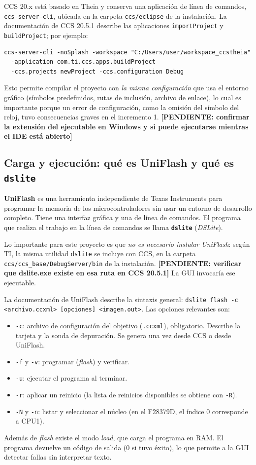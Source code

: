 \documentclass[12pt,letterpaper]{article}
\newcommand{\pendiente}[1]{\textbf{[PENDIENTE: #1]}}
\begin{document}
CCS 20.x está basado en Theia y conserva una aplicación de línea de comandos, \texttt{ccs-server-cli}, ubicada en la carpeta \texttt{ccs/eclipse} de la instalación. La documentación de CCS 20.5.1 describe las aplicaciones \texttt{importProject} y \texttt{buildProject}; por ejemplo:
\begin{lstlisting}
ccs-server-cli -noSplash -workspace "C:/Users/user/workspace_ccstheia"
  -application com.ti.ccs.apps.buildProject
  -ccs.projects newProject -ccs.configuration Debug
\end{lstlisting}
Esto permite compilar el proyecto con \emph{la misma configuración} que usa el entorno gráfico (símbolos predefinidos, rutas de inclusión, archivo de enlace), lo cual es importante porque un error de configuración, como la omisión del símbolo del reloj, tuvo consecuencias graves en el incremento 1. \pendiente{confirmar la extensión del ejecutable en Windows y si puede ejecutarse mientras el IDE está abierto}

\subsection{Carga y ejecución: qué es UniFlash y qué es \texttt{dslite}}
\label{sec:uniflash}

\textbf{UniFlash} es una herramienta independiente de Texas Instruments para programar la memoria de los microcontroladores sin usar un entorno de desarrollo completo. Tiene una interfaz gráfica y una de línea de comandos. El programa que realiza el trabajo en la línea de comandos se llama \textbf{\texttt{dslite}} (\textit{DSLite}).

Lo importante para este proyecto es que \emph{no es necesario instalar UniFlash}: según TI, la misma utilidad \texttt{dslite} se incluye con CCS, en la carpeta \texttt{ccs/ccs\_base/DebugServer/bin} de la instalación. \pendiente{verificar que dslite.exe existe en esa ruta en CCS 20.5.1} La GUI invocaría ese ejecutable.

La documentación de UniFlash describe la sintaxis general: \texttt{dslite flash -c <archivo.ccxml> [opciones] <imagen.out>}. Las opciones relevantes son:
\begin{itemize}
    \item \texttt{-c}: archivo de configuración del objetivo (\texttt{.ccxml}), obligatorio. Describe la tarjeta y la sonda de depuración. Se genera una vez desde CCS o desde UniFlash.
    \item \texttt{-f} y \texttt{-v}: programar (\textit{flash}) y verificar.
    \item \texttt{-u}: ejecutar el programa al terminar.
    \item \texttt{-r}: aplicar un reinicio (la lista de reinicios disponibles se obtiene con \texttt{-R}).
    \item \texttt{-N} y \texttt{-n}: listar y seleccionar el núcleo (en el F28379D, el índice 0 corresponde a CPU1).
\end{itemize}
Además de \textit{flash} existe el modo \textit{load}, que carga el programa en RAM. El programa devuelve un código de salida (0 si tuvo éxito), lo que permite a la GUI detectar fallas sin interpretar texto.
\end{document}
